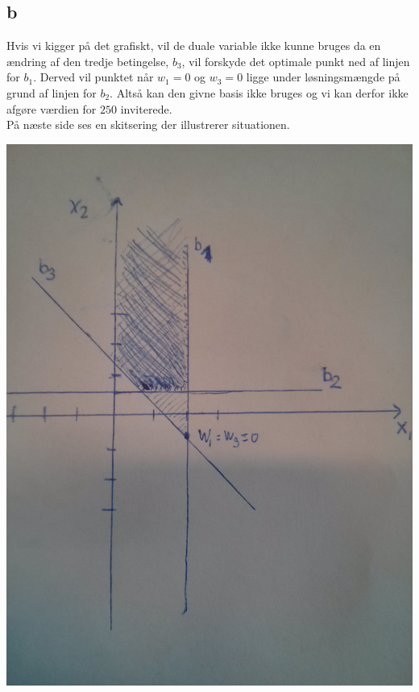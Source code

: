 \documentclass[a4paper]{article}
\begin{document}
\subsection*{b}
Hvis vi kigger på det grafiskt, vil de duale variable ikke kunne bruges da en ændring af den tredje betingelse, $b_3$, vil forskyde det optimale punkt ned af linjen for $b_1$. Derved vil punktet når $w_1=0$ og $w_3=0$ ligge under løsningsmængde på grund af linjen for $b_2$. Altså kan den givne basis ikke bruges og vi kan derfor ikke afgøre værdien for $250$ inviterede.\\
På næste side ses en skitsering der illustrerer situationen.
\begin{center}
\includegraphics[scale=0.1]{img2}
\end{center}
\end{document}

